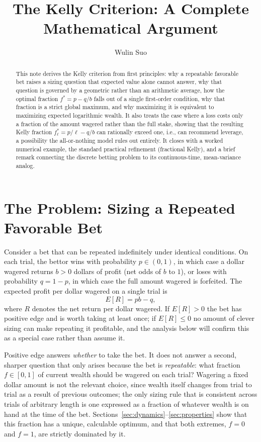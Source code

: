 \documentclass[11pt]{article}
\title{The Kelly Criterion: A Complete Mathematical Argument}
\author{Wulin Suo}
\date{}
\theoremstyle{remark}
\theoremstyle{definition}
\begin{document}
\maketitle

\begin{abstract}
\noindent This note derives the Kelly criterion from first principles: why a repeatable favorable bet raises a sizing question that expected value alone cannot answer, why that question is governed by a geometric rather than an arithmetic average, how the optimal fraction $f^{*}=p-q/b$ falls out of a single first-order condition, why that fraction is a strict global maximum, and why maximizing it is equivalent to maximizing expected logarithmic wealth. It also treats the case where a loss costs only a fraction of the amount wagered rather than the full stake, showing that the resulting Kelly fraction $f_\ell^{*}=p/\ell-q/b$ can rationally exceed one, i.e., can recommend leverage, a possibility the all-or-nothing model rules out entirely. It closes with a worked numerical example, the standard practical refinement (fractional Kelly), and a brief remark connecting the discrete betting problem to its continuous-time, mean-variance analog.
\end{abstract}

\section{The Problem: Sizing a Repeated Favorable Bet}
\label{sec:setup}

Consider a bet that can be repeated indefinitely under identical conditions. On each trial, the bettor wins with probability $p\in(0,1)$, in which case a dollar wagered returns $b>0$ dollars of profit (net odds of $b$ to $1$), or loses with probability $q=1-p$, in which case the full amount wagered is forfeited. The expected profit per dollar wagered on a single trial is
\begin{equation}
E[R] = pb - q,
\label{eq:edge}
\end{equation}
where $R$ denotes the net return per dollar wagered. If $E[R]>0$ the bet has positive edge and is worth taking at least once; if $E[R]\le 0$ no amount of clever sizing can make repeating it profitable, and the analysis below will confirm this as a special case rather than assume it.

Positive edge answers \emph{whether} to take the bet. It does not answer a second, sharper question that only arises because the bet is \emph{repeatable}: what fraction $f\in[0,1]$ of current wealth should be wagered on each trial? Wagering a fixed dollar amount is not the relevant choice, since wealth itself changes from trial to trial as a result of previous outcomes; the only sizing rule that is consistent across trials of arbitrary length is one expressed as a fraction of whatever wealth is on hand at the time of the bet. Sections~\ref{sec:dynamics}--\ref{sec:properties} show that this fraction has a unique, calculable optimum, and that both extremes, $f=0$ and $f=1$, are strictly dominated by it.
\end{document}
